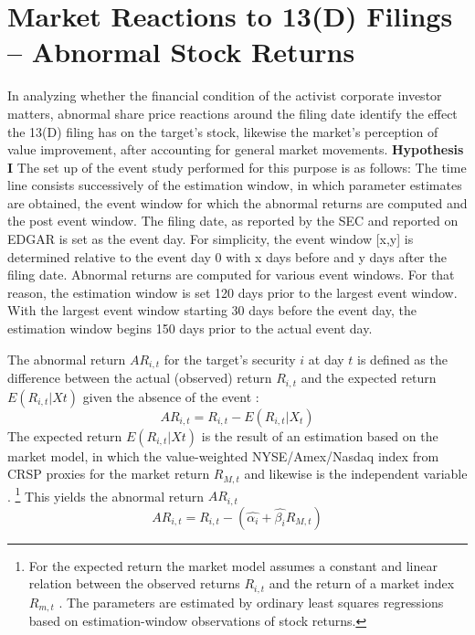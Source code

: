 \documentclass[12pt]{article}
\begin{document}
\section{Market Reactions to 13(D) Filings -- Abnormal Stock Returns}
\noindent In analyzing whether the financial condition of the activist corporate investor matters, abnormal share price reactions around the filing date identify the effect the 13(D) filing has on the target's stock, likewise the market's perception of value improvement, after accounting for general market movements.
\textbf{Hypothesis I}
The set up of the event study performed for this purpose is as follows: The time line consists successively of the estimation window, in which parameter estimates are obtained, the event window for which the abnormal returns are computed and the post event window. 
The filing date, as reported by the SEC and reported on EDGAR is set as the event day. For simplicity, the event window [x,y] is determined relative to the event day 0 with x days before and y days after the filing date. Abnormal returns are computed for various event windows. For that reason, the estimation window is set 120 days prior to the largest event window. With the largest event window starting 30 days before the event day, the estimation window begins 150 days prior to the actual event day.\par
The abnormal return $AR_{i,t}$ for the target's security $i$ at day $t$ is defined as the difference between the actual (observed) return $R_{i,t}$ and the expected return $E(R_{i,t}|X{t})$ given the absence of the event \citep[p.15]{MacKinlay1997}:
	\begin{equation}\label{eq:1}
		AR_{i,t}=R_{i,t}-E(R_{i,t}|X_{t})
	\end{equation}
The expected return $E(R_{i,t}|X{t})$ is the result of an estimation based on the market model, in which the value-weighted NYSE/Amex/Nasdaq index from CRSP proxies for the market return $R_{M,t}$ and likewise is the independent variable \citep[p.18]{MacKinlay1997}.
	\footnote{For the expected return the market model assumes a constant and linear relation between the observed returns $R_{i,t}$ and the return of a market index $R_{m,t}$ \citep[p.18]{MacKinlay1997}. The parameters are estimated by ordinary least squares regressions based on estimation-window observations of stock returns.}
This yields the abnormal return $AR_{i,t}$
	\begin{equation}\label{eq:2}
		AR_{i,t}=R_{i,t}-(\hat{\alpha_{i}}+\hat{\beta_{i}}R_{M,t})
	\end{equation}
\end{document}
